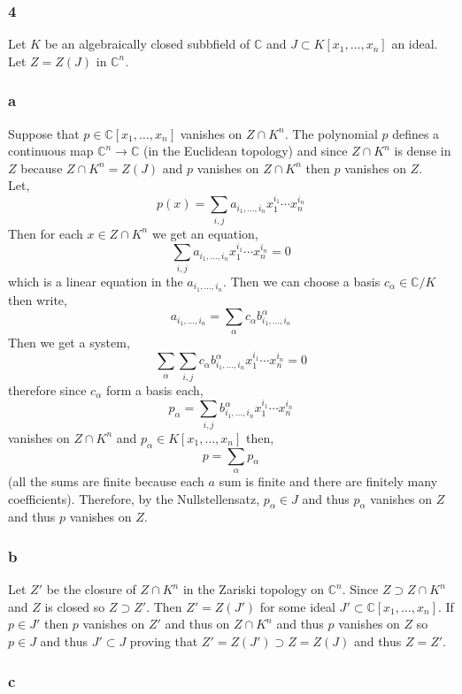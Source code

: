 \documentclass[12pt]{article}
\renewcommand{\C}{\mathbb{C}}
\begin{document}
\subsubsection{4}

Let $K$ be an algebraically closed subbfield of $\C$ and $J \subset K[x_1, \dots, x_n]$ an ideal. Let $Z = Z(J)$ in $\C^n$.

\subsubsection{a}

Suppose that $p \in \C[x_1, \dots, x_n]$ vanishes on $Z \cap K^n$. The polynomial $p$ defines a continuous map $\C^n \to \C$ (in the Euclidean topology) and since $Z \cap K^n$ is dense in $Z$ because $Z \cap K^n = Z(J)$ and $p$ vanishes on $Z \cap K^n$ then $p$ vanishes on $Z$.
\bigskip\\
Let,
\[ p(x) = \sum_{i,j} a_{i_1, \dots, i_n} x_1^{i_1} \cdots x_n^{i_n} \]
Then for each $x \in Z \cap K^n$ we get an equation,
\[ \sum_{i,j} a_{i_1, \dots, i_n} x_1^{i_1} \cdots x_n^{i_n} = 0 \]
which is a linear equation in the $a_{i_1, \dots, i_n}$. Then we can choose a basis $c_\alpha \in \C / K$ then write,
\[ a_{i_1, \dots, i_n} = \sum_{\alpha} c_\alpha b^\alpha_{i_1, \dots, i_n} \]
Then we get a system,
\[ \sum_{\alpha} \sum_{i,j} c_\alpha b^\alpha_{i_1, \dots, i_n} x_1^{i_1} \cdots x_n^{i_n} = 0 \]
therefore since $c_\alpha$ form a basis each,
\[ p_\alpha = \sum_{i,j} b^\alpha_{i_1, \dots, i_n} x_1^{i_1} \cdots x_n^{i_n} \]
vanishes on $Z \cap K^n$ and $p_\alpha \in K[x_1, \dots, x_n]$ then,
\[ p  = \sum_{\alpha} p_\alpha \]
(all the sums are finite because each $a$ sum is finite and there are finitely many coefficients). Therefore, by the Nullstellensatz, $p_\alpha \in J$ and thus $p_\alpha$ vanishes on $Z$ and thus $p$ vanishes on $Z$.

\subsubsection{b}

Let $Z'$ be the closure of $Z \cap K^n$ in the Zariski topology on $\C^n$. Since $Z \supset Z \cap K^n$ and $Z$ is closed so $Z \supset Z'$. Then $Z' = Z(J')$ for some ideal $J' \subset \C[x_1, \dots, x_n]$. If $p \in J'$ then $p$ vanishes on $Z'$ and thus on $Z \cap K^n$ and thus $p$ vanishes on $Z$ so $p \in J$ and thus $J' \subset J$ proving that $Z' = Z(J') \supset Z = Z(J)$ and thus $Z = Z'$.

\subsubsection{c}
\end{document}
